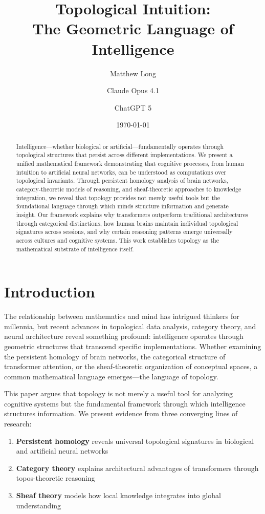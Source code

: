 \documentclass[11pt]{article}
\title{\textbf{Topological Intuition: \\
The Geometric Language of Intelligence}}
\author[1]{Matthew Long}
\author[2]{Claude Opus 4.1}
\author[3]{ChatGPT 5}
\affil[1]{YonedaAI}
\affil[2]{Anthropic}
\affil[3]{OpenAI}
\date{\today}
\begin{document}
\maketitle

\begin{abstract}
Intelligence—whether biological or artificial—fundamentally operates through topological structures that persist across different implementations. We present a unified mathematical framework demonstrating that cognitive processes, from human intuition to artificial neural networks, can be understood as computations over topological invariants. Through persistent homology analysis of brain networks, category-theoretic models of reasoning, and sheaf-theoretic approaches to knowledge integration, we reveal that topology provides not merely useful tools but the foundational language through which minds structure information and generate insight. Our framework explains why transformers outperform traditional architectures through categorical distinctions, how human brains maintain individual topological signatures across sessions, and why certain reasoning patterns emerge universally across cultures and cognitive systems. This work establishes topology as the mathematical substrate of intelligence itself.
\end{abstract}

\tableofcontents

\section{Introduction}

The relationship between mathematics and mind has intrigued thinkers for millennia, but recent advances in topological data analysis, category theory, and neural architecture reveal something profound: intelligence operates through geometric structures that transcend specific implementations. Whether examining the persistent homology of brain networks, the categorical structure of transformer attention, or the sheaf-theoretic organization of conceptual spaces, a common mathematical language emerges—the language of topology.

This paper argues that topology is not merely a useful tool for analyzing cognitive systems but the fundamental framework through which intelligence structures information. We present evidence from three converging lines of research:

\begin{enumerate}
\item \textbf{Persistent homology} reveals universal topological signatures in biological and artificial neural networks
\item \textbf{Category theory} explains architectural advantages of transformers through topos-theoretic reasoning
\item \textbf{Sheaf theory} models how local knowledge integrates into global understanding
\end{enumerate}
\end{document}

